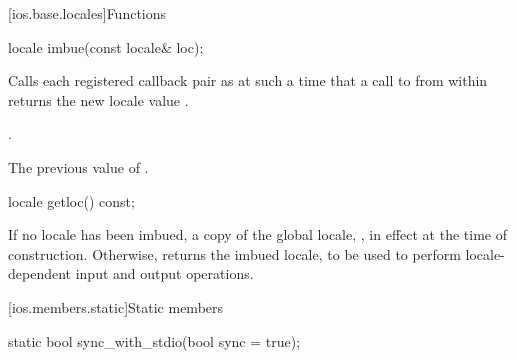 [ios.base.locales]{Functions}

%
\begin{itemdecl}
locale imbue(const locale& loc);
\end{itemdecl}

\begin{itemdescr}
\pnum
\effects
Calls each registered callback pair
as
at such a time that a call to
from within
returns the new locale value
.

\pnum
\ensures
{}.

\pnum
\returns
The previous value of
.
\end{itemdescr}

%
\begin{itemdecl}
locale getloc() const;
\end{itemdecl}

\begin{itemdescr}
\pnum
\returns
If no locale has been imbued, a copy of the global \Cpp{} locale,
,
in effect at the time of construction.
Otherwise, returns the imbued locale, to be used to
perform locale-dependent input and output operations.
\end{itemdescr}

[ios.members.static]{Static members}

%
\begin{itemdecl}
static bool sync_with_stdio(bool sync = true);
\end{itemdecl}

